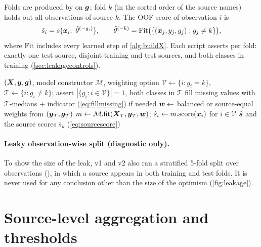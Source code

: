 Folds are produced by  on $\bm{g}$; fold $k$ (in the sorted order of the source names) holds out all
observations of source $k$. The OOF score of observation $i$ is
\begin{equation}
\hat s_i = s\bigl(\xv_i;\ \hat\theta^{(-g_i)}\bigr),\qquad \hat\theta^{(-k)} = \mathrm{Fit}\bigl(\{(\xv_j,y_j,g_j): g_j\ne k\}\bigr), \label{eq:oof}
\end{equation}
where $\mathrm{Fit}$ includes every learned step of \cref{alg:buildX}. Each script asserts per fold: exactly one test
source, disjoint training and test sources, and both classes in training (\cref{sec:leakagecontrols}).

\begin{algorithm}[htbp]
\caption{Leave-one-source-out OOF scores (, )}\label{alg:loso}
\begin{algorithmic}[1]
\Require $(\bm{X},\bm{y},\bm{g})$, model constructor $\mathcal M$, weighting option
   \State $\mathcal V\gets\{i: g_i=k\}$, $\mathcal T\gets\{i:g_i\ne k\}$; assert $|\{g_i:i\in\mathcal V\}|=1$, both classes in $\mathcal T$
   \State fill missing values with $\mathcal T$-medians + indicator (\cref{eq:fillmissing}) if needed
   \State $\bm{w}\gets$ balanced or source-equal weights from $(\bm{y}_\mathcal T,\bm{g}_\mathcal T)$
   \State $m\gets\mathcal M.\mathrm{fit}(\bm{X}_\mathcal T,\bm{y}_\mathcal T,\bm{w})$; $\hat s_i\gets m.\mathrm{score}(\bm{x}_i)$ for $i\in\mathcal V$
\EndFor
\State \Return $\hat{\bm{s}}$ and the source scores $\bar s_k$ (\cref{eq:sourcescore})
\end{algorithmic}
\end{algorithm}

\paragraph{Leaky observation-wise split (diagnostic only).} To show the size of the leak, v1 and v2 also ran a
stratified 5-fold split over observations (), in which a
source appears in both training and test folds. It is never used for any conclusion other than the size of the
optimism (\cref{fig:leakage}).

\section{Source-level aggregation and thresholds}\label{sec:threshold}

